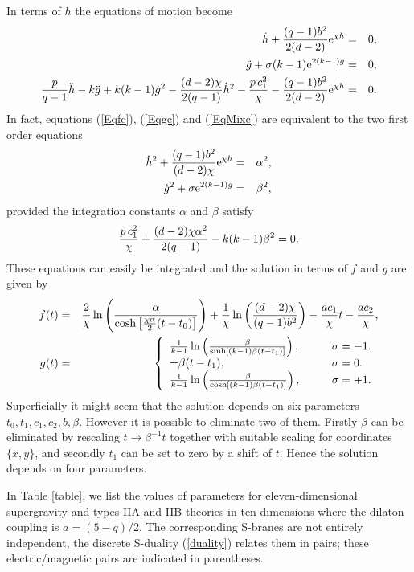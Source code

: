 \documentclass[a4paper,aps,nofootinbib,showpacs,preprint]{revtex4}
\begin{document}
In terms of $h$ the equations of motion become
\begin{eqnarray}
\ddot{h} + \frac{(q-1)b^2}{2(d-2)} {\rm e}^{\chi h} &=& 0,
\label{Eqfc} \\
\ddot g + \sigma (k-1) {\rm e}^{2(k-1) g} &=& 0, \label{Eqgc} \\
\frac{p}{q-1} \ddot{h} - k \ddot g + k(k-1) \dot g^2 - \frac{(d-2)
\chi}{2(q-1)} \dot {h}^2 -{p\, c_1^2\over \chi} - \frac{(q-1)
b^2}{2(d-2)} {\rm e}^{\chi h} &=& 0. \label{EqMixc}
\end{eqnarray}
In fact, equations (\ref{Eqfc}), (\ref{Eqgc}) and (\ref{EqMixc})
are equivalent to the two first order equations
\begin{eqnarray}
\dot h^2 + \frac{(q-1) b^2}{(d-2)\chi} {\rm e}^{\chi h} &=&
\alpha^2, \\
\dot g^2 + \sigma {\rm e}^{2(k-1) g} &=& \beta^2,
\end{eqnarray}
provided the integration constants $\alpha$ and $\beta$ satisfy
\begin{equation}
{p\, c_1^2 \over \chi} + {(d-2) \chi \alpha^2\over 2(q-1)} -
k(k-1) \beta^2 = 0. \label{intrel}
\end{equation}
These equations can easily be integrated and the solution in
terms of $f$ and $g$ are given by
\begin{eqnarray}
f(t) &=&  \frac2{\chi} \ln \left( \frac{\alpha}{\cosh \left[ {\chi
\alpha \over 2}(t-t_0) \right]} \right) + \frac1{\chi} \ln \left(
{ (d-2) \chi \over (q-1) b^2 } \right) - {a c_1\over
\chi}t - {a c_2\over \chi}, \\
g(t) &=& \left\{ \begin{array}{ll}
 \frac1{k-1}\ln\left(\frac{\beta}{\sinh[(k-1) \beta (t-t_1)
   ]} \right), \qquad & \sigma=-1. \\
 \pm \beta (t-t_1), & \sigma=0. \\
 \frac1{k-1}\ln\left(\frac{\beta}{\cosh[(k-1) \beta (t-t_1)
   ]} \right), & \sigma=+1. \end{array} \right.
\end{eqnarray}
Superficially it might seem that the solution depends on six
parameters $t_0,t_1,c_1,c_2,b,\beta$. However it is possible to
eliminate two of them. Firstly $\beta$ can be eliminated by
rescaling $t\to \beta^{-1} t$ together with suitable scaling for
coordinates $\{x,y\}$, and secondly $t_1$ can be set to zero by a
shift of $t$. Hence the solution depends on four parameters.

In Table \ref{table}, we list the values of parameters for
eleven-dimensional supergravity and types IIA and IIB theories in
ten dimensions where the dilaton coupling is $a=(5-q)/2$. The
corresponding S-branes are not entirely independent, the discrete
S-duality (\ref{duality}) relates them in pairs; these
electric/magnetic pairs are indicated in parentheses.
\end{document}

